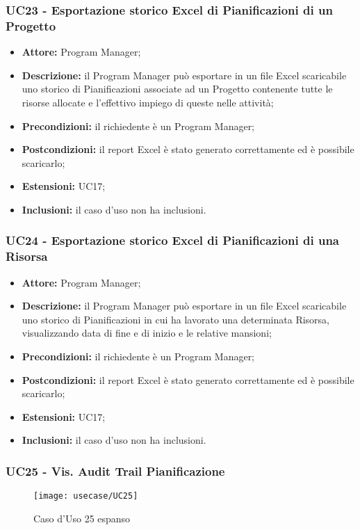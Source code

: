 \subsubsection*{UC23 - Esportazione storico Excel di Pianificazioni di un Progetto}
\begin{itemize}[label=$\circ$]
\item \textbf{Attore:} Program Manager;
\item \textbf{Descrizione:} il Program Manager può esportare in un file Excel scaricabile uno storico di Pianificazioni associate ad un Progetto contenente tutte le risorse allocate e l’effettivo impiego di queste nelle attività;
\item \textbf{Precondizioni:} il richiedente è un Program Manager;
\item \textbf{Postcondizioni:} il report Excel è stato generato correttamente ed è possibile
scaricarlo;
\item \textbf{Estensioni:} UC17;
\item \textbf{Inclusioni:} il caso d'uso non ha inclusioni.
\end{itemize}

\subsubsection*{UC24 - Esportazione storico Excel di Pianificazioni di una Risorsa}
\begin{itemize}[label=$\circ$]
\item \textbf{Attore:} Program Manager;
\item \textbf{Descrizione:} il Program Manager può esportare in un file Excel scaricabile uno storico di Pianificazioni in cui ha lavorato una determinata Risorsa, visualizzando data di fine e di inizio e le relative mansioni;
\item \textbf{Precondizioni:} il richiedente è un Program Manager;
\item \textbf{Postcondizioni:} il report Excel è stato generato correttamente ed è possibile
scaricarlo;
\item \textbf{Estensioni:} UC17;
\item \textbf{Inclusioni:} il caso d'uso non ha inclusioni.
\end{itemize}

\subsubsection*{UC25 - Vis. Audit Trail Pianificazione}
\begin{figure}[H] 
	\centering
    \texttt{[image: usecase/UC25]} 
    \caption{Caso d'Uso 25 espanso}
\end{figure}

